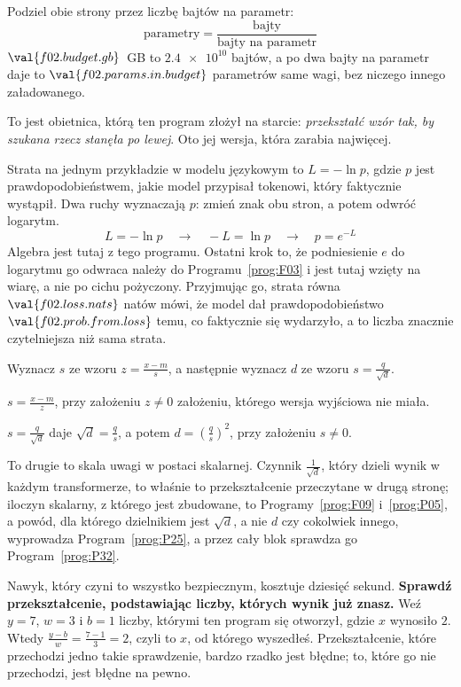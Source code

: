 \begin{fr}
\begin{ansblock}
Podziel obie strony przez liczbę bajtów na parametr:
\[ \text{parametry} = \frac{\text{bajty}}{\text{bajty na parametr}} \]
$\val{f02.budget.gb}$~GB to $\num{2.4e10}$ bajtów, a po dwa bajty na parametr
daje to $\val{f02.params.in.budget}$ parametrów \dash{} same wagi, bez niczego
innego załadowanego.
\end{ansblock}

To jest obietnica, którą ten program złożył na starcie: \emph{przekształć wzór
tak, by szukana rzecz stanęła po lewej}. Oto jej wersja, która zarabia
najwięcej.

Strata na jednym przykładzie w modelu językowym to $L = -\ln p$, gdzie $p$ jest
prawdopodobieństwem, jakie model przypisał tokenowi, który faktycznie
wystąpił. Dwa ruchy wyznaczają $p$: zmień znak obu stron, a potem odwróć
logarytm.
\[ L = -\ln p \quad\longrightarrow\quad -L = \ln p
   \quad\longrightarrow\quad p = e^{-L} \]
Algebra jest tutaj z tego programu. Ostatni krok \dash{} to, że podniesienie
$e$ do logarytmu go odwraca \dash{} należy do Programu~\ref{prog:F03} i jest
tutaj wzięty na wiarę, a nie po cichu pożyczony. Przyjmując go, strata równa
$\val{f02.loss.nats}$ natów mówi, że model dał prawdopodobieństwo
$\val{f02.prob.from.loss}$ temu, co faktycznie się wydarzyło, a to liczba
znacznie czytelniejsza niż sama strata.

\yourturn
Wyznacz $s$ ze wzoru $z = \frac{x - m}{s}$, a następnie wyznacz $d$ ze wzoru
$s = \frac{q}{\sqrt{d}}$.
\dotline
\nextframe
\end{fr}

\begin{fr}
\begin{ansblock}
$s = \frac{x - m}{z}$, przy założeniu $z \ne 0$ \dash{} założeniu, którego
wersja wyjściowa nie miała.

$s = \frac{q}{\sqrt{d}}$ daje $\sqrt{d} = \frac{q}{s}$, a potem
$d = \left(\frac{q}{s}\right)^{2}$, przy założeniu $s \ne 0$.
\end{ansblock}

To drugie to skala uwagi w postaci skalarnej. Czynnik
$\frac{1}{\sqrt{d}}$, który dzieli wynik w każdym transformerze, to właśnie to
przekształcenie przeczytane w drugą stronę; iloczyn skalarny, z którego jest
zbudowane, to Programy~\ref{prog:F09} i~\ref{prog:P05}, a powód, dla którego
dzielnikiem jest $\sqrt{d}$, a nie $d$ czy cokolwiek innego, wyprowadza
Program~\ref{prog:P25}, a przez cały blok sprawdza go
Program~\ref{prog:P32}.

\begin{note}
Nawyk, który czyni to wszystko bezpiecznym, kosztuje dziesięć sekund.
\textbf{Sprawdź przekształcenie, podstawiając liczby, których wynik już znasz.}
Weź $y = 7$, $w = 3$ i $b = 1$ \dash{} liczby, którymi ten program się
otworzył, gdzie $x$ wynosiło $2$. Wtedy
$\frac{y - b}{w} = \frac{7 - 1}{3} = 2$, czyli to $x$, od którego wyszedłeś.
Przekształcenie, które przechodzi jedno takie sprawdzenie, bardzo rzadko jest
błędne; to, które go nie przechodzi, jest błędne na pewno.
\end{note}
\end{fr}

